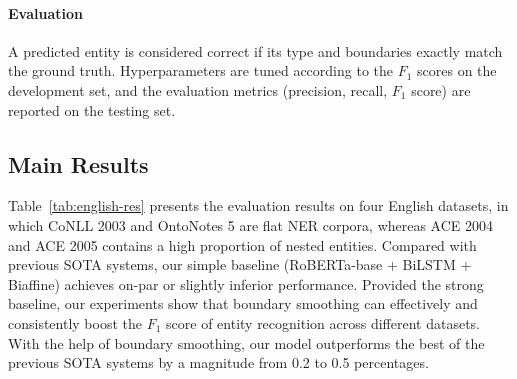 \documentclass[11pt]{article}
\begin{document}
\paragraph{Evaluation} A predicted entity is considered correct if its type and boundaries exactly match the ground truth. Hyperparameters are tuned according to the $F_1$ scores on the development set, and the evaluation metrics (precision, recall, $F_1$ score) are reported on the testing set. 

\subsection{Main Results}

Table~\ref{tab:english-res} presents the evaluation results on four English datasets, in which CoNLL 2003 and OntoNotes 5 are flat NER corpora, whereas ACE 2004 and ACE 2005 contains a high proportion of nested entities. Compared with previous SOTA systems, our simple baseline (RoBERTa-base + BiLSTM + Biaffine) achieves on-par or slightly inferior performance. Provided the strong baseline, our experiments show that boundary smoothing can effectively and consistently boost the $F_1$ score of entity recognition across different datasets. With the help of boundary smoothing, our model outperforms the best of the previous SOTA systems by a magnitude from 0.2 to 0.5 percentages. 
\end{document}
